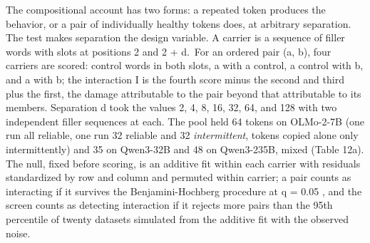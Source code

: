 \documentclass[11pt]{article}
\begin{document}
The compositional account has two forms: a repeated token produces the behavior, or a pair of individually healthy tokens does, at arbitrary separation. The test makes separation the design variable. A carrier is a sequence of filler words with slots at positions 2 and 2 + d.~For an ordered pair (a, b), four carriers are scored: control words in both slots, a with a control, a control with b, and a with b; the interaction I is the fourth score minus the second and third plus the first, the damage attributable to the pair beyond that attributable to its members. Separation d took the values 2, 4, 8, 16, 32, 64, and 128 with two independent filler sequences at each. The pool held 64 tokens on OLMo-2-7B (one run all reliable, one run 32 reliable and 32 \emph{intermittent}, tokens copied alone only intermittently) and 35 on Qwen3-32B and 48 on Qwen3-235B, mixed (Table 12a). The null, fixed before scoring, is an additive fit within each carrier with residuals standardized by row and column and permuted within carrier; a pair counts as interacting if it survives the Benjamini-Hochberg procedure at q = 0.05 \citep{benjamini1995}, and the screen counts as detecting interaction if it rejects more pairs than the 95th percentile of twenty datasets simulated from the additive fit with the observed noise.

\begingroup\footnotesize\setlength{\tabcolsep}{4pt}\renewcommand{\arraystretch}{1.15}
\end{document}
